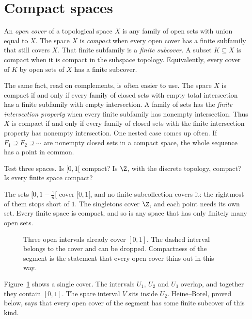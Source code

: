 \section{Compact spaces}

\begin{definition}
An \emph{open cover} of a topological space $X$ is any family of open sets with union equal to $X$. The space $X$ is \emph{compact} when every open cover has a finite subfamily that still covers $X$. That finite subfamily is a \emph{finite subcover}. A subset $K\subseteq X$ is compact when it is compact in the subspace topology. Equivalently, every cover of $K$ by open sets of $X$ has a finite subcover.
\end{definition}

The same fact, read on complements, is often easier to use. The space $X$ is compact if and only if every family of closed sets with empty total intersection has a finite subfamily with empty intersection. A family of sets has the \emph{finite intersection property} when every finite subfamily has nonempty intersection. Thus $X$ is compact if and only if every family of closed sets with the finite intersection property has nonempty intersection. One nested case comes up often. If $F_1\supseteq F_2\supseteq\cdots$ are nonempty closed sets in a compact space, the whole sequence has a point in common.

\begin{think}
Test three spaces. Is $[0,1[$ compact? Is $\Z$, with the discrete topology, compact? Is every finite space compact?
\end{think}

The sets $[0,1-\frac1n[$ cover $[0,1[$, and no finite subcollection covers it: the rightmost of them stops short of $1$. The singletons cover $\Z$, and each point needs its own set. Every finite space is compact, and so is any space that has only finitely many open sets.

\begin{figure}[ht]
\centering
{}
\caption{Three open intervals already cover $[0,1]$. The dashed interval belongs to the cover and can be dropped. Compactness of the segment is the statement that every open cover thins out in this way.}
\label{fig:subcover}
\end{figure}

Figure~\ref{fig:subcover} shows a single cover. The intervals $U_1$, $U_2$ and $U_3$ overlap, and together they contain $[0,1]$. The spare interval $V$ sits inside $U_2$. Heine--Borel, proved below, says that every open cover of the segment has some finite subcover of this kind.

